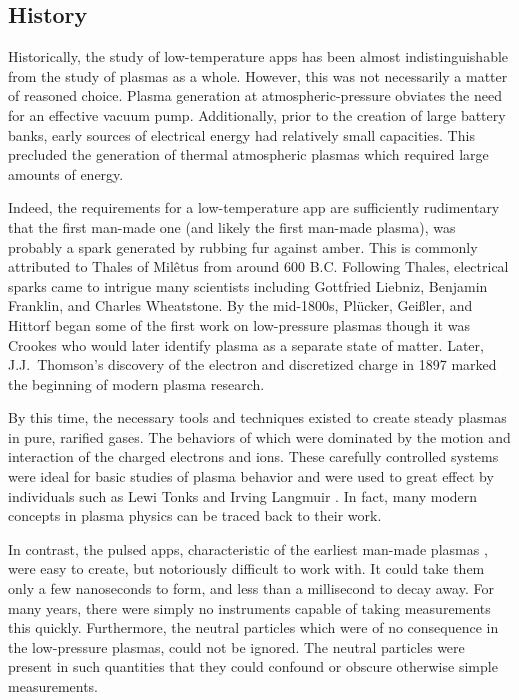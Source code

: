 \subsection{History}

Historically, the study of low-temperature \acs{app}s has been almost
indistinguishable from the study of plasmas as a whole. However, this was not
necessarily a matter of reasoned choice. Plasma generation at
atmospheric-pressure obviates the need for an effective vacuum pump.
Additionally, prior to the creation of large battery banks, early sources of
electrical energy had relatively small capacities. This precluded the generation
of thermal atmospheric plasmas which required large amounts of energy.

Indeed, the requirements for a low-temperature \acs{app} are sufficiently
rudimentary that the first man-made one (and likely the first man-made plasma),
was probably a spark generated by rubbing fur against amber. This is commonly
attributed to Thales of Mil\^{e}tus from around 600 B.C. Following Thales,
electrical sparks came to intrigue many scientists including Gottfried Liebniz,
Benjamin Franklin, and Charles Wheatstone. By the mid-1800s, Pl\"{u}cker,
Gei\ss{}ler, and Hittorf began some of the first work on low-pressure plasmas
though it was Crookes who would later identify plasma as a separate state of
matter. Later, J.J.\ Thomson's discovery of the electron and discretized charge
in 1897 marked the beginning of modern plasma research.

By this time, the necessary tools and techniques existed to create steady
plasmas in pure, rarified gases. The behaviors of which were dominated by the
motion and interaction of the charged electrons and ions. These carefully
controlled systems were ideal for basic studies of plasma behavior and were used
to great effect by individuals such as Lewi Tonks and Irving Langmuir
\cite{Tonks1929}. In fact, many modern concepts in plasma physics can be traced
back to their work.

In contrast, the pulsed \acs{app}s, characteristic of the earliest man-made
plasmas \cite{Anders2003}, were easy to create, but notoriously difficult to
work with. It could take them only a few nanoseconds to form, and less than a
millisecond to decay away. For many years, there were simply no instruments
capable of taking measurements this quickly. Furthermore, the neutral particles
which were of no consequence in the low-pressure plasmas, could not be ignored.
The neutral particles were present in such quantities that they could confound
or obscure otherwise simple measurements.

